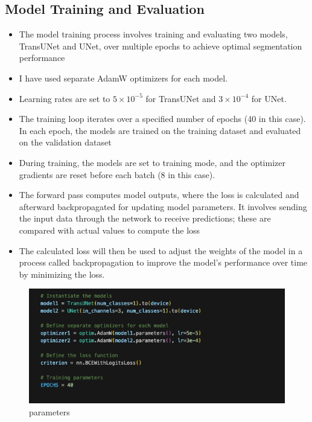 \documentclass[11pt,a4paper]{article}
\begin{document}
\subsection{Model Training and Evaluation}
\begin{itemize}
    \item The model training process involves training and evaluating two models, TransUNet and UNet, over multiple epochs to achieve optimal segmentation performance
    \item I have used separate AdamW optimizers for each model.
    \item Learning rates are set to \(5 \times 10^{-5}\) for TransUNet and \(3 \times 10^{-4}\) for UNet.
    \item The training loop iterates over a specified number of epochs (40 in this case). In each epoch, the models are trained on the training dataset and evaluated on the validation dataset
    \item During training, the models are set to training mode, and the optimizer gradients are reset before each batch (8 in this case).
    \item The forward pass computes model outputs, where the loss is calculated and afterward backpropagated for updating model parameters. It involves sending the input data through the network to receive predictions; these are compared with actual values to compute the loss
    \item The calculated loss will then be used to adjust the weights of the model in a process called backpropagation to improve the model's performance over time by minimizing the loss.

\end{itemize}
\begin{figure}[H]
    \centering
    \includegraphics[width= 0.9\linewidth]{parameters.png}
    \caption{parameters}
    
\end{figure}
\vspace{0.5cm}
\end{document}
